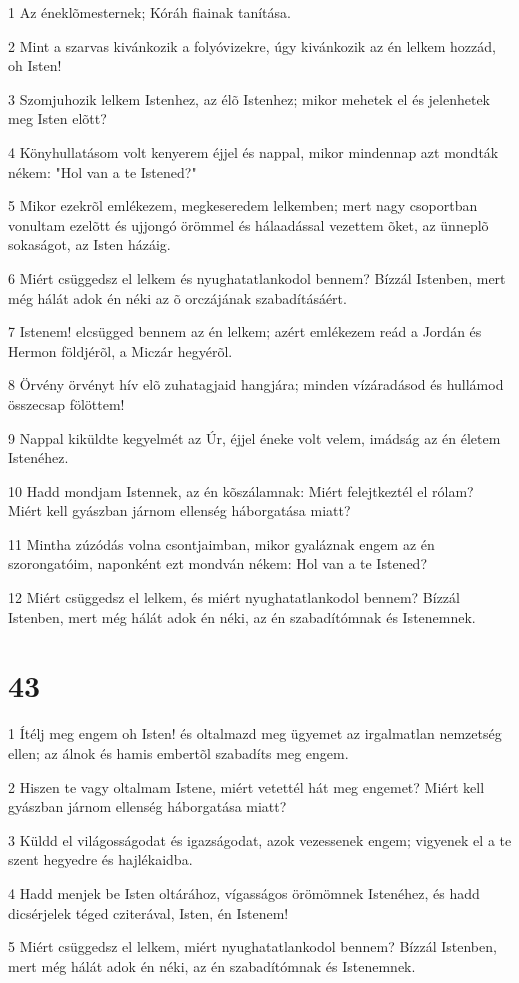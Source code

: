 \par 1 Az éneklõmesternek; Kóráh fiainak tanítása.
\par 2 Mint a szarvas kivánkozik a folyóvizekre, úgy kivánkozik az én lelkem hozzád, oh Isten!
\par 3 Szomjuhozik lelkem Istenhez, az élõ Istenhez; mikor mehetek el és jelenhetek meg Isten elõtt?
\par 4 Könyhullatásom volt kenyerem éjjel és nappal, mikor mindennap azt mondták nékem: "Hol van a te Istened?"
\par 5 Mikor ezekrõl emlékezem, megkeseredem lelkemben; mert nagy csoportban vonultam ezelõtt és ujjongó örömmel és hálaadással vezettem õket, az ünneplõ sokaságot, az Isten házáig.
\par 6 Miért csüggedsz el lelkem és nyughatatlankodol bennem? Bízzál Istenben, mert még hálát adok én néki az õ orczájának szabadításáért.
\par 7 Istenem! elcsügged bennem az én lelkem; azért emlékezem reád a Jordán és Hermon földjérõl, a Miczár hegyérõl.
\par 8 Örvény örvényt hív elõ zuhatagjaid hangjára; minden vízáradásod és hullámod összecsap fölöttem!
\par 9 Nappal kiküldte kegyelmét az Úr, éjjel éneke volt velem, imádság az én életem Istenéhez.
\par 10 Hadd mondjam Istennek, az én kõszálamnak: Miért felejtkeztél el rólam? Miért kell gyászban járnom ellenség háborgatása miatt?
\par 11 Mintha zúzódás volna csontjaimban, mikor gyaláznak engem az én szorongatóim, naponként ezt mondván nékem: Hol van a te Istened?
\par 12 Miért csüggedsz el lelkem, és miért nyughatatlankodol bennem? Bízzál Istenben, mert még hálát adok én néki, az én szabadítómnak és Istenemnek.

\chapter{43}

\par 1 Ítélj meg engem oh Isten! és oltalmazd meg ügyemet az irgalmatlan nemzetség ellen; az álnok és hamis embertõl szabadíts meg engem.
\par 2 Hiszen te vagy oltalmam Istene, miért vetettél hát meg engemet? Miért kell gyászban járnom ellenség háborgatása miatt?
\par 3 Küldd el világosságodat és igazságodat, azok vezessenek engem; vigyenek el a te szent hegyedre és hajlékaidba.
\par 4 Hadd menjek be Isten oltárához, vígasságos örömömnek Istenéhez, és hadd dicsérjelek téged cziterával, Isten, én Istenem!
\par 5 Miért csüggedsz el lelkem, miért nyughatatlankodol bennem? Bízzál Istenben, mert még hálát adok én néki, az én szabadítómnak és Istenemnek.

